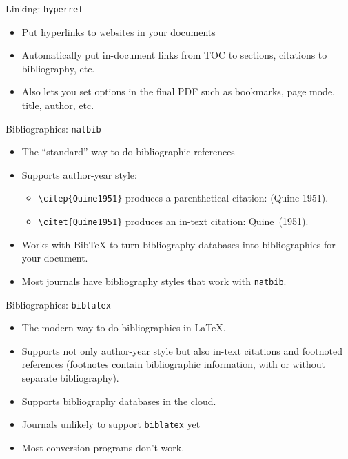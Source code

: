 \begin{frame}{Linking: \texttt{hyperref}}

\begin{itemize}
\item Put hyperlinks to websites in your documents
\item Automatically put in-document links from TOC to sections,
  citations to bibliography, etc.
\item Also lets you set options in the final PDF such as bookmarks,
  page mode, title, author, etc.
\end{itemize}

\end{frame}

\begin{frame}[fragile]{Bibliographies: \texttt{natbib}}

\begin{itemize}
\item The ``standard'' way to do bibliographic references
\item Supports author-year style:
\begin{itemize}
\item \verb+\citep{Quine1951}+ produces a parenthetical citation: (Quine 1951).
\item \verb+\citet{Quine1951}+ produces an in-text citation: Quine~(1951).
\end{itemize}
\item Works with Bib\TeX{} to turn bibliography databases into
  bibliographies for your document.
\item Most journals have bibliography styles that work with \texttt{natbib}.
\end{itemize}

\end{frame}

\begin{frame}{Bibliographies: \texttt{biblatex}}

\begin{itemize}
\item The modern way to do bibliographies in \LaTeX.
\item Supports not only author-year style but also in-text citations
  and footnoted references (footnotes contain bibliographic
  information, with or without separate bibliography).
\item Supports bibliography databases in the cloud.
\item Journals unlikely to support \texttt{biblatex} yet
\item Most conversion programs don't work.
\end{itemize}

\end{frame}

